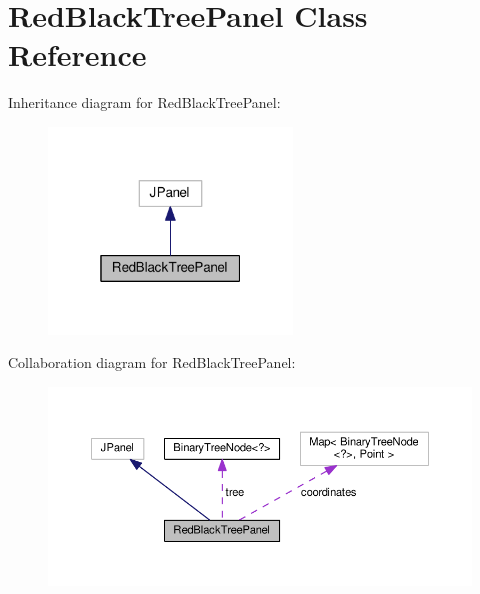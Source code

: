 \hypertarget{class_red_black_tree_panel}{}\section{Red\+Black\+Tree\+Panel Class Reference}
\label{class_red_black_tree_panel}


Inheritance diagram for Red\+Black\+Tree\+Panel\+:
\nopagebreak
\begin{figure}[H]
\begin{center}
\leavevmode
\includegraphics[width=184pt]{class_red_black_tree_panel__inherit__graph}
\end{center}
\end{figure}


Collaboration diagram for Red\+Black\+Tree\+Panel\+:
\nopagebreak
\begin{figure}[H]
\begin{center}
\leavevmode
\includegraphics[width=350pt]{class_red_black_tree_panel__coll__graph}
\end{center}
\end{figure}
